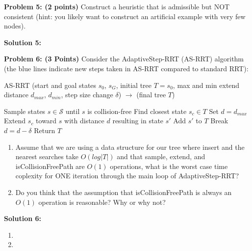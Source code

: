 \documentclass[]{article}
\begin{document}
\clearpage

\textbf{Problem 5: (2 points)}
Construct a heuristic that is admissible but NOT consistent (hint: you likely want to construct an artificial example with very few nodes).
\bigskip

\textbf{Solution 5:}

\clearpage
\textbf{Problem 6: (3 Points)} Consider the AdaptiveStep-RRT (AS-RRT) algorithm (the {\color{blue} blue lines} indicate new steps taken in AS-RRT compared to standard RRT):

\begin{algorithm}[!h]
\begin{spacing}{1.25}
\begin{algorithmic}[1]
\caption{AS-RRT (start and goal states $s_0$, $s_G$, initial tree $T = s_0$, {\color{blue} max and min extend distance $d_{max}$, $d_{min}$, step size change $\delta$}) $\rightarrow$ (final tree $T$)} 
   \State Sample states $s \in \mathcal{S}$ until $s$ is collision-free
   \State Find closest state $s_c \in T$
   {\color{blue}\State Set $d = d_{max}$}
   {\color{blue}}
        \State Extend $s_c$ toward $s$ with distance $d$ resulting in state $s'$
            \State Add $s'$ to $T$
            {\color{blue} \State Break}
        \Else
            \State $d = d - \delta$
        \EndIf 
   \EndWhile
   Return $T$
\EndFor
\end{algorithmic}
\end{spacing}
\end{algorithm}

\begin{enumerate}[label=(\alph*)]
    \item Assume that we are using a data structure for our tree where insert and the nearest searches take $O(log|T|)$ and that sample, extend, and isCollisionFreePath are $O(1)$ operations, what is the worst case time coplexity for ONE iteration through the main loop of AdaptiveStep-RRT?
    
    \item Do you think that the assumption that isCollisionFreePath is always an $O(1)$ operation is reasonable? Why or why not?
\end{enumerate}

\textbf{Solution 6:}
\begin{enumerate}[label=(\alph*)]
    \item %
    \item %
\end{enumerate}
\end{document}
